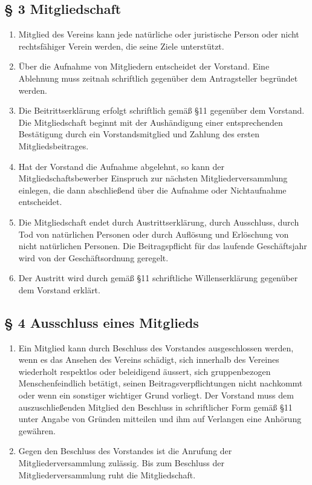 ﻿\documentclass[10pt,a4paper]{scrartcl}
\begin{document}
\subsection*{§ 3 Mitgliedschaft}
\begin{enumerate}
        \item Mitglied des Vereins kann jede natürliche oder juristische Person oder
                nicht rechts\-fähiger Verein werden, die seine Ziele unterstützt.
        \item Über die Aufnahme von Mitgliedern entscheidet der Vorstand. Eine Ablehnung muss zeitnah schriftlich gegenüber dem Antragsteller begründet werden.
        \item Die Beitrittserklärung erfolgt schriftlich gemäß §11 gegenüber dem Vorstand. Die
                Mitgliedschaft beginnt mit der Aushändigung einer entsprechenden Bestätigung durch
                ein Vorstandsmitglied und Zahlung des ersten Mitgliedsbeitrages.
        \item Hat der Vorstand die Aufnahme abgelehnt, so kann der Mitgliedschaftsbewerber Einspruch
                zur nächsten Mitgliederversammlung einlegen, die dann abschließend über die Aufnahme
                oder Nichtaufnahme entscheidet.
        \item Die Mitgliedschaft endet durch Austrittserklärung, durch Ausschluss, durch Tod von
                natür\-li\-chen Personen oder durch Auflösung und Erlöschung von nicht
                natür\-lichen Personen.
                Die Beitragspflicht für das laufende Geschäftsjahr wird von der Geschäftsordnung
                geregelt.
        \item Der Austritt wird durch gemäß §11 schriftliche Willenserklärung gegenüber dem Vorstand
                erklärt.
\end{enumerate}
%
%
\subsection*{§ 4 Ausschluss eines Mitglieds }
\begin{enumerate}
        \item Ein Mitglied kann durch Beschluss des Vorstandes ausgeschlossen werden, wenn es das
                Ansehen des Vereins schädigt, sich innerhalb des Vereines wiederholt respektlos oder 
                beleidigend äussert, sich gruppenbezogen Menschenfeindlich betätigt, seinen Beitragsverpflichtungen nicht nachkommt oder 
                wenn ein sonstiger wichtiger Grund vorliegt. Der Vorstand muss dem auszuschließenden
                Mitglied den Beschluss in schriftlicher Form gemäß §11 unter Angabe von Gründen
                mitteilen und ihm auf Verlangen eine Anhörung gewähren.
        \item Gegen den Beschluss des Vorstandes ist die Anrufung der Mitgliederversammlung
                zu\-läs\-sig. Bis zum Beschluss der Mitgliederversammlung ruht die Mitgliedschaft.
        
\end{enumerate}
%
%
\end{document}
